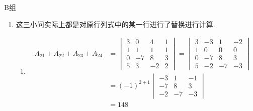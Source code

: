 \centerline{\heiti B组}
\begin{enumerate}
    \item 这三小问实际上都是对原行列式中的某一行进行了替换进行计算.
          \begin{enumerate}
              \item \begin{align*}
                        A_{21}+A_{22}+A_{23}+A_{24}
                         & = \begin{vmatrix}
                                 3 & 0  & 4  & 1 \\
                                 1 & 1  & 1  & 1 \\
                                 0 & -7 & 8  & 3 \\
                                 5 & 3  & -2 & 2
                             \end{vmatrix}
                        = \begin{vmatrix}
                              3 & -3 & 1  & -2 \\
                              1 & 0  & 0  & 0  \\
                              0 & -7 & 8  & 3  \\
                              5 & -2 & -7 & -3
                          \end{vmatrix}           \\
                         & = (-1)^{2+1} \begin{vmatrix}
                                            -3 & 1  & -1 \\
                                            -7 & 8  & 3  \\
                                            -2 & -7 & -3
                                        \end{vmatrix} \\
                         & = 148
                    \end{align*}


\end{enumerate}
\end{enumerate}
